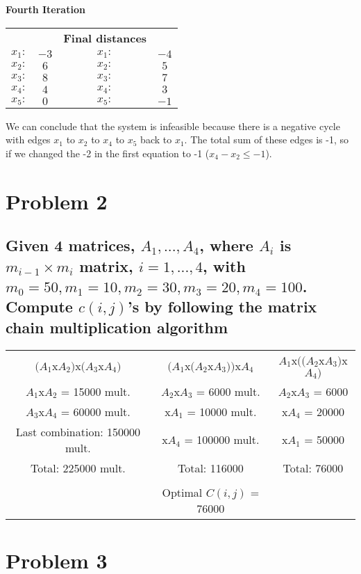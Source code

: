 \documentclass{article}
\begin{document}
 \textbf{Fourth Iteration}
	\begin{center}
		\begin{tabular}{c c |c c}
						&		&		\textbf{Final distances}\\        
			    $x_1:$&$-3$ & $x_1:$&$-4$ \\
                $x_2:$&$6$  & $x_2:$&$5$ \\
                $x_3:$&$8$  & $x_3:$&$7$\\
                $x_4:$&$4$  & $x_4:$&$3$\\
                $x_5:$&$0$  & $x_5:$&$-1$\\
		\end{tabular}
	\end{center}
 We can conclude that the system is infeasible because there is a negative cycle with edges $x_1$ to $x_2$ to $x_4$ to $x_5$ back to $x_1$. The total sum of these edges is -1, so if we changed the -2 in the first equation to -1 ($x_4-x_2\leq-1$).
\section*{Problem 2}
\subsection*{Given 4 matrices, $A_1, . . . , A_4$, where $A_i$
is $m_{i - 1} × m_i$ matrix, $i = 1, . . . , 4$, with
$m_0 = 50, m_1 = 10, m_2 = 30, m_3 = 20, m_4 = 100$.
Compute $c(i, j)$'s by following the matrix chain multiplication algorithm}
\begin{center}
\begin{tabular}{c c c}
	$(A_1$x$A_2)$x$(A_3$x$A_4)$ & $(A_1$x$(A_2$x$A_3))$x$A_4$ & $A_1$x$((A_2$x$A_3)$x$A_4)$\\
    $A_1$x$A_2$ = 15000 mult. & $A_2$x$A_3$ = 6000 mult. & $A_2$x$A_3$ = 6000\\
    $A_3$x$A_4$ = 60000 mult. & x$A_1$ = 10000 mult. & x$A_4$ = 20000\\
    Last combination: 150000 mult. & x$A_4$ = 100000 mult. &x$A_1$ = 50000\\
    Total: 225000 mult. & Total: 116000 & Total: 76000\\
    \\
    & Optimal $C(i,j)$ = 76000
    
\end{tabular}
\end{center}
    
	
\section*{ Problem 3}
    

		
\end{document}
